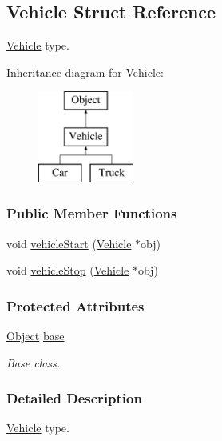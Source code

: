 \hypertarget{struct_vehicle}{}\subsection{Vehicle Struct Reference}
\label{struct_vehicle}


\hyperlink{struct_vehicle}{Vehicle} type.  


Inheritance diagram for Vehicle\+:\begin{figure}[H]
\begin{center}
\leavevmode
\includegraphics[height=3.000000cm]{struct_vehicle}
\end{center}
\end{figure}
\subsubsection*{Public Member Functions}
\begin{DoxyCompactItemize}
\item 
void \hyperlink{struct_vehicle_a6891d3d28853bc3fdd075596dc6de9f8}{vehicle\+Start} (\hyperlink{struct_vehicle}{Vehicle} $\ast$obj)
\item 
void \hyperlink{struct_vehicle_a4dcbcba43792dcd673a552b14479ab77}{vehicle\+Stop} (\hyperlink{struct_vehicle}{Vehicle} $\ast$obj)
\end{DoxyCompactItemize}
\subsubsection*{Protected Attributes}
\begin{DoxyCompactItemize}
\item 
\mbox{\label{struct_vehicle_ad7970f528d429f6fc1725173e93a77c2}} 
\hyperlink{struct_object}{Object} \hyperlink{struct_vehicle_ad7970f528d429f6fc1725173e93a77c2}{base}
\begin{DoxyCompactList}\small\item\em Base class. \end{DoxyCompactList}\end{DoxyCompactItemize}


\subsubsection{Detailed Description}
\hyperlink{struct_vehicle}{Vehicle} type. 

